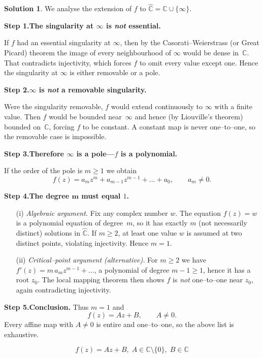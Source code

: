 \documentclass[12pt]{article}
\theoremstyle{definition} %
\newtheorem{solution}{Solution}
\theoremstyle{plain} %
\begin{document}
    \begin{solution}
    We analyse the extension of $f$ to $\widehat{\mathbb{C}}=\mathbb{C}\cup\{\infty\}$.
    
    \medskip
    \textbf{Step 1.\;The singularity at $\boldsymbol{\infty}$ is \emph{not} essential.}
    
    If $f$ had an essential singularity at $\infty$, then by the
    Casorati–Weierstrass (or Great Picard) theorem the image of every neighbourhood of $\infty$ would be dense in~$\mathbb{C}$.  
    That contradicts injectivity, which forces $f$ to omit every value except one.  
    Hence the singularity at $\infty$ is either removable or a pole.
    
    \medskip
    \textbf{Step 2.\;$\boldsymbol{\infty}$ is \emph{not} a removable singularity.}
    
    Were the singularity removable, $f$ would extend continuously to $\infty$ with a finite value.  
    Then $f$ would be bounded near~$\infty$ and hence (by Liouville’s theorem) bounded on~$\mathbb{C}$, forcing $f$ to be constant.  
    A constant map is never one–to–one, so the removable case is impossible.
    
    \medskip
    \textbf{Step 3.\;Therefore $\boldsymbol{\infty}$ is a pole—$f$ is a polynomial.}
    
    If the order of the pole is $m\ge1$ we obtain
    \[
       f(z)=a_m z^{m}+a_{m-1}z^{m-1}+\dots+a_0 ,
       \qquad a_m\neq0 .
    \]
    
    \medskip
    \textbf{Step 4.\;The degree $\boldsymbol{m}$ must equal $1$.}
    
    \begin{itemize}
       \item[(i)]  \emph{Algebraic argument.}
       Fix any complex number $w$.  
       The equation $f(z)=w$ is a polynomial equation of degree~$m$, so it has
       exactly $m$ (not necessarily distinct) solutions in $\widehat{\mathbb{C}}$.  
       If $m\ge2$, at least one value $w$ is assumed at two distinct points,
       violating injectivity.  
       Hence $m=1$.
       
       \item[(ii)] \emph{Critical–point argument (alternative).}
       For $m\ge2$ we have $f'(z)=m\,a_m z^{m-1}+\dots$,
       a polynomial of degree $m-1\ge1$, hence it has a root $z_0$.  
       The local mapping theorem then shows $f$ is \emph{not} one–to–one near $z_0$,
       again contradicting injectivity.
    \end{itemize}
    
    \medskip
    \textbf{Step 5.\;Conclusion.}
    Thus $m=1$ and
    \[
         f(z)=A z+B ,\qquad A\neq0 .
    \]
    Every affine map with $A\ne0$ is entire and one–to–one, so the above list is exhaustive.
    
    \[
       \boxed{\,f(z)=A z + B,\; A\in\mathbb{C}\setminus\{0\},\; B\in\mathbb{C}\,}
    \]
    \end{solution}
    
\end{document}
